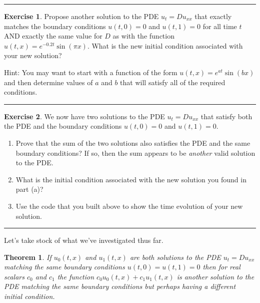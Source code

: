 \documentclass[
]{book}
\providecommand{\tightlist}{%
  \setlength{\itemsep}{0pt}\setlength{\parskip}{0pt}}
\newtheorem{theorem}{Theorem}[chapter]
\theoremstyle{definition}
\theoremstyle{definition}
\theoremstyle{definition}
\newtheorem{exercise}{Exercise}[chapter]
\theoremstyle{remark}
\begin{document}
\begin{center}\rule{0.5\linewidth}{0.5pt}\end{center}

\begin{exercise}
\protect\hypertarget{exr:unnamed-chunk-524}{}{\label{exr:unnamed-chunk-524} }Propose another solution to the PDE \(u_t = D u_{xx}\) that exactly matches the boundary conditions \(u(t,0)=0\) and \(u(t,1)=0\) for all time \(t\) AND exactly the same value for \(D\) as with the function \(u(t,x) = e^{-0.2t} \sin(\pi x)\). What is the new initial condition associated with your new solution?

Hint: You may want to start with a function of the form \(u(t,x) = e^{at} \sin( bx)\) and then determine values of \(a\) and \(b\) that will satisfy all of the required conditions.
\end{exercise}

\begin{center}\rule{0.5\linewidth}{0.5pt}\end{center}

\begin{exercise}
\protect\hypertarget{exr:unnamed-chunk-525}{}{\label{exr:unnamed-chunk-525} }We now have two solutions to the PDE \(u_t = D u_{xx}\) that satisfy both the PDE and the boundary conditions \(u(t,0) = 0\) and \(u(t,1)=0\).

\begin{enumerate}
\def\labelenumi{\alph{enumi}.}
\tightlist
\item
  Prove that the sum of the two solutions also satisfies the PDE and the same boundary conditions? If so, then the sum appears to be \emph{another} valid solution to the PDE.
\item
  What is the initial condition associated with the new solution you found in part (a)?
\item
  Use the code that you built above to show the time evolution of your new solution.
\end{enumerate}
\end{exercise}

\begin{center}\rule{0.5\linewidth}{0.5pt}\end{center}

Let's take stock of what we've investigated thus far.

\begin{theorem}
\protect\hypertarget{thm:unnamed-chunk-526}{}{\label{thm:unnamed-chunk-526} }If \(u_0(t,x)\) and \(u_1(t,x)\) are both solutions to the PDE \(u_t = D u_{xx}\) matching the same boundary conditions \(u(t,0) = u(t,1) = 0\) then for real scalars \(c_0\) and \(c_1\) the function \(c_0 u_0(t,x) + c_1 u_1(t,x)\) is another solution to the PDE matching the same boundary conditions but perhaps having a different initial condition.
\end{theorem}
\end{document}
